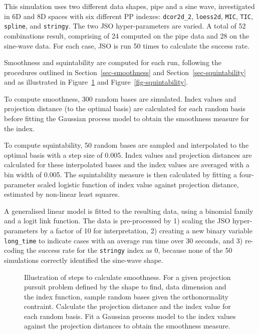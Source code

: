 \documentclass[
  number,
  preprint,
  3p]{elsarticle}
\begin{document}
This simulation uses two different data shapes, pipe and a sine wave,
investigated in 6D and 8D spaces with six different PP indexes:
\texttt{dcor2d\_2}, \texttt{loess2d}, \texttt{MIC}, \texttt{TIC},
\texttt{spline}, and \texttt{stringy}. The two JSO hyper-parameters are
varied. A total of 52 combinations result, comprising of 24 computed on
the pipe data and 28 on the sine-wave data. For each case, JSO is run 50
times to calculate the success rate.

Smoothness and squintability are computed for each run, following the
procedures outlined in Section~\ref{sec-smoothness} and
Section~\ref{sec-squintability} and as illustrated in
Figure~\ref{fig-smoothness} and Figure~\ref{fig-squintability}.

To compute smoothness, 300 random bases are simulated. Index values and
projection distance (to the optimal basis) are calculated for each
random basis before fitting the Gaussian process model to obtain the
smoothness measure for the index.

To compute squintability, 50 random bases are sampled and interpolated
to the optimal basis with a step size of 0.005. Index values and
projection distances are calculated for these interpolated bases and the
index values are averaged with a bin width of 0.005. The squintability
measure is then calculated by fitting a four-parameter scaled logistic
function of index value against projection distance, estimated by
non-linear least squares.

A generalised linear model is fitted to the resulting data, using a
binomial family and a logit link function. The data is pre-processed by
1) scaling the JSO hyper-parameters by a factor of 10 for
interpretation, 2) creating a new binary variable \texttt{long\_time} to
indicate cases with an average run time over 30 seconds, and 3)
re-coding the success rate for the \texttt{stringy} index as 0, because
none of the 50 simulations correctly identified the sine-wave shape.

\begin{figure}


\caption{\label{fig-smoothness}Illustration of steps to calculate
smoothness. For a given projection pursuit problem defined by the shape
to find, data dimension and the index function, sample random bases
given the orthonormality contraint. Calculate the projection distance
and the index value for each random basis. Fit a Gaussian process model
to the index values against the projection distances to obtain the
smoothness measure.}

\end{figure}%
\end{document}
